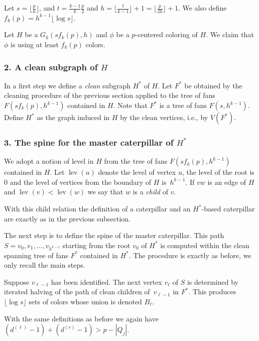 \smallskip

Let $s=\lfloor \frac{p}{k} \rfloor$, and
$t =  \frac{k-1}{k}\frac{p}{2} $ and $h = \lfloor \frac{t}{k-1} \rfloor +1 =
\lfloor \frac{p}{2k} \rfloor +1$.  We also define 
$f_k(p) = h^{k-1} \lfloor\log s\rfloor$.

Let $H$ be a $G_k(s f_k(p), h)$ and $\phi$ be a $p$-centered coloring of
$H$. We claim that $\phi$ is using at least $f_k(p)$ colors.

\subsubsection*{2.  A clean subgraph of $H$}\hfill


In a first step we define a \emph{clean} subgraph $H^*$ of $H$. Let $F^*$ be
obtained by the cleaning procedure of the previous section applied to the tree
of fans $F(s f_k(p),h^{k-1})$ contained in $H$.  Note that $F^*$ is a
tree of fans $F(s,h^{k-1})$. Define $H^*$ as the graph
induced in $H$ by the clean vertices, i.e., by $V(F^*)$.


\subsubsection*{3.  The spine for the master caterpillar of $H^*$}\hfill

We adopt a notion of level in $H$ from the tree of fans
$F(s f_k(p),h^{k-1})$ contained in $H$. Let $\operatorname{lev}(u)$ denote the level of
vertex $u$, the level of the root is 0 and the level of vertices from the
boundary of $H$ is~$h^{k-1}$. If $vw$ is an edge of $H$ and
$\operatorname{lev}(v) < \operatorname{lev}(w)$ we say that $w$ is a
\emph{child} of $v$.

With this child relation the definition of a caterpillar and an $H^*$-based
caterpillar are exactly as in the previous subsection.

The next step is to define the spine of the master caterpillar.
This path $S=v_0,v_1,\ldots,v_{h^{k-1}}$ starting from the root $v_0$ of $H^*$
is computed within the clean spanning tree of fans $F^*$
contained in $H^*$.
The procedure is exactly as before, we only recall the main steps.

Suppose $v_{\ell-1}$ has been identified.
The next vertex $v_{\ell}$ of $S$ is determined by iterated halving of the path of
clean children of~$v_{\ell-1}$ in $F^*$. This produces $\lfloor\log s\rfloor$ sets of colors whose
union is denoted $B_\ell$.

With the same definitions as before we again have
$(d^{(\ell)}-1)+(d^{(r)}-1) > p - |Q_j|$. 

